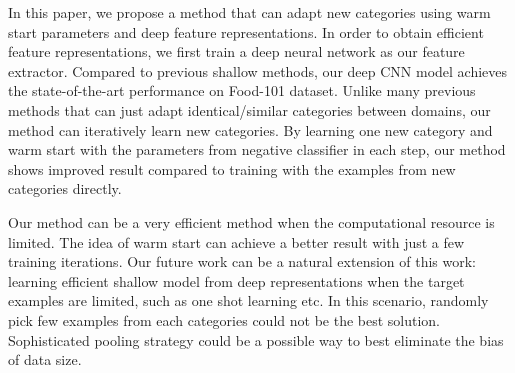 In this paper, we propose a method that can adapt new categories using warm start parameters and deep feature representations. In order to obtain efficient feature representations, we first train a deep neural network as our feature extractor. Compared to previous shallow methods, our deep CNN model achieves the state-of-the-art performance on Food-101 dataset. Unlike many previous methods that can just adapt identical/similar categories between domains,  our method can iteratively learn new categories. By learning one new category and warm start with the parameters from negative classifier in each step, our method shows improved result compared to training with the examples from new categories directly.

Our method can be a very efficient method when the computational resource is limited. The idea of warm start can achieve a better result with just a few training iterations. Our future work can be a natural extension of this work: learning efficient shallow model from deep representations when the target examples are limited, such as one shot learning etc. In this scenario, randomly pick few examples from each categories could not be the best solution. Sophisticated pooling strategy could be a possible way to best eliminate the bias of data size.

